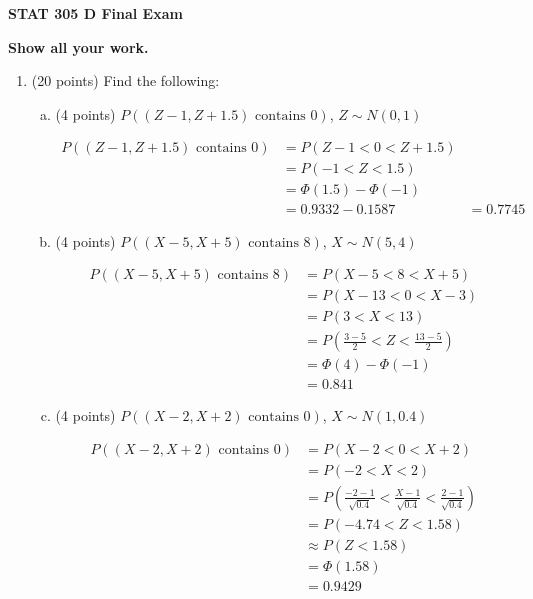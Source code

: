 \documentclass{article}\usepackage{graphicx, color}
\numberwithin{equation}{section}
\begin{document}
\begin{flushleft}


\Huge
\begin{center}
{\bf STAT 305 D Final Exam}
\end{center} 
\huge
\begin{center}
{\bf Show all your work.}
\end{center}

\normalsize
\begin{enumerate}[1. ]

\item (20 points) Find the following:

\begin{enumerate}[a. ]
\item (4 points) $P((Z - 1, Z + 1.5) \text{ contains } 0)$, $Z \sim N(0,1)$

{\color{red}
\begin{align*}
P((Z - 1, Z + 1.5) \text{ contains } 0) &= P(Z - 1 < 0 < Z + 1.5) \\
&= P(-1 < Z < 1.5) \\
&= \Phi(1.5) - \Phi(-1) \\
&= 0.9332 - 0.1587
&= 0.7745
\end{align*}}

\item (4 points) $P((X - 5, X + 5) \text{ contains } 8)$, $X \sim N(5,4)$

{\color{red}
\begin{align*}
P((X - 5, X + 5) \text{ contains } 8) & = P(X - 5 < 8 < X + 5) \\
&= P(X - 13 < 0 < X - 3) \\
&= P( 3 < X < 13) \\
&= P( \frac{3-5}{2} < Z < \frac{13-5}{2}) \\
&= \Phi(4) - \Phi(-1) \\
&= 0.841
\end{align*}
}

\item (4 points) $P((X - 2, X + 2) \text{ contains } 0)$, $X \sim N(1,0.4)$

{\color{red}
\begin{align*}
P((X - 2, X + 2) \text{ contains } 0) &= P(X - 2 < 0 < X + 2) \\
&= P(-2 < X  < 2) \\
&= P(\frac{-2 -1 }{\sqrt{0.4}} < \frac{X - 1}{\sqrt{0.4}} < \frac{2-1}{\sqrt{0.4}}) \\
&= P(-4.74 < Z < 1.58) \\
&\approx P(Z < 1.58) \\
&= \Phi(1.58) \\
&=  0.9429
\end{align*}
}



\end{enumerate}
\end{enumerate}
\end{flushleft}
\end{document}
